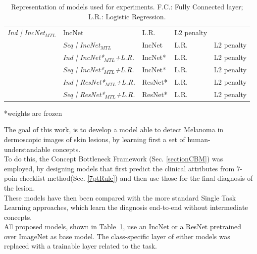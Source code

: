 \begin{table}[]
\begin{tabular}{|l|l|l|l|l|}
  \textit{Ind | IncNet$_{MTL}$} &
  IncNet &
  L.R. &
  L2 penalty \\
 & \textit{Seq | IncNet$_{MTL}$}       & IncNet  & L.R.     & L2 penalty    \\
 & \textit{Ind | IncNet*$_{MTL}$+L.R.} & IncNet* & L.R.     & L2 penalty     \\
 & \textit{Seq | IncNet*$_{MTL}$+L.R.} & IncNet* & L.R.     & L2 penalty     \\
 & \textit{Ind | ResNet*$_{MTL}$+L.R.} & ResNet* & L.R.     & L2 penalty    \\
 & \textit{Seq | ResNet*$_{MTL}$+L.R.} & ResNet* & L.R.     & L2 penalty     \\ \hline
\end{tabular}
\caption*{*weights are frozen}
\caption{Representation of models used for experiments. F.C.: Fully Connected layer; L.R.: Logistic Regression.}
\label{table:modelsTable}
\end{table}
The goal of this work, is to develop a model able to detect Melanoma in dermoscopic images of skin lesions, by learning first a set of human-understandable concepts. \\
To do this, the Concept Bottleneck Framework (Sec. \ref{sectionCBM}) was employed, by designing models that first predict the clinical attributes from 7-poin checklist method(Sec. \ref{7ptRule}) and then use those for the final diagnosis of the lesion. \\
These models have then been compared with the more standard Single Task Learning approaches, which learn the diagnosis end-to-end without intermediate concepts.\\ 
All proposed models, shown in Table~\ref{table:modelsTable}, use an IncNet or a ResNet pretrained over ImageNet as base model. The class-specific layer of either models was replaced with a trainable layer related to the task. \\

